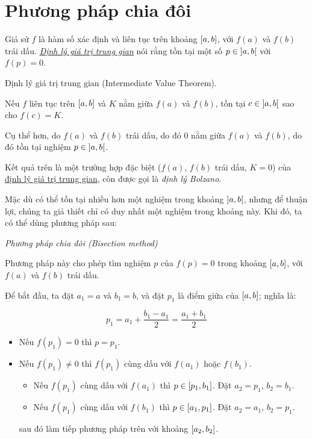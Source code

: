 \documentclass[../../Lectures]{subfiles}
\begin{document}
\section{Phương pháp chia đôi}

Giả sử \(f\) là hàm số xác định và liên tục trên khoảng \(\interval{a}{b}\), với
\(f(a)\) và \(f(b)\) trái dấu.
\emph{\hyperref[thm:intermediate_value_theorem]{Định lý giá trị trung gian}} nói
rằng tồn tại một số \(p \in \interval[open]{a}{b}\) với \(f(p) = 0\).

\begin{theorem}\label{thm:intermediate_value_theorem}
    Định lý giá trị trung gian (Intermediate Value Theorem).

    Nếu \(f\) liên tục trên \(\interval{a}{b}\) và \(K\) nằm giữa \(f(a)\) và
    \(f(b)\), tồn tại \(c \in \interval[open]{a}{b}\) sao cho \(f(c) = K\).
\end{theorem}

Cụ thể hơn, do \(f(a)\) và \(f(b)\) trái dấu, do đó \(0\) nằm giữa \(f(a)\) và
\(f(b)\), do đó tồn tại nghiệm \(p \in \interval[open]{a}{b}\).

Kết quả trên là một trường hợp đặc biệt (\(f(a)\), \(f(b)\) trái dấu, \(K = 0\))
của \hyperref[thm:intermediate_value_theorem]{định lý giá trị trung gian}, còn
được gọi là \emph{định lý Bolzano}.

Mặc dù có thể tồn tại nhiều hơn một nghiệm trong khoảng
\(\interval[open]{a}{b}\), nhưng để thuận lợi, chúng ta giả thiết chỉ có duy
nhất một nghiệm trong khoảng này. Khi đó, ta có thể dùng phương pháp sau:

\begin{method}\label{method:bisection}
    \emph{Phương pháp chia đôi (Bisection method)}

    Phương pháp này cho phép tìm nghiệm \(p\) của \(f(p) = 0\) trong khoảng
    \(\interval{a}{b}\), với \(f(a)\) và \(f(b)\) trái dấu.

    Để bắt đầu, ta đặt \(a_1 = a\) và \(b_1 = b\), và đặt \(p_1\) là điểm giữa
    của \(\interval{a}{b}\); nghĩa là:

    \[p_1 = a_1 + \frac{b_1 - a_1}{2} = \frac{a_1 + b_1}{2}\]

    \begin{itemize}
        \item Nếu \(f(p_1) = 0\) thì \(p = p_1\).
        \item Nếu \(f(p_1) \neq 0\) thì \(f(p_1)\) cùng dấu với \(f(a_1)\) hoặc
            \(f(b_1)\).
            \begin{itemize}
                \item Nếu \(f(p_1)\) cùng dấu với \(f(a_1)\) thì \(p \in
                    \interval{p_1}{b_1}\). Đặt \(a_2 = p_1\), \(b_2 = b_1\).
                \item Nếu \(f(p_1)\) cùng dấu với \(f(b_1)\) thì \(p \in
                    \interval{a_1}{p_1}\). Đặt \(a_2 = a_1\), \(b_2 = p_1\).
            \end{itemize}
            sau đó làm tiếp phương pháp trên với khoảng \(\interval{a_2}{b_2}\).
    \end{itemize}
\end{method}
\end{document}
